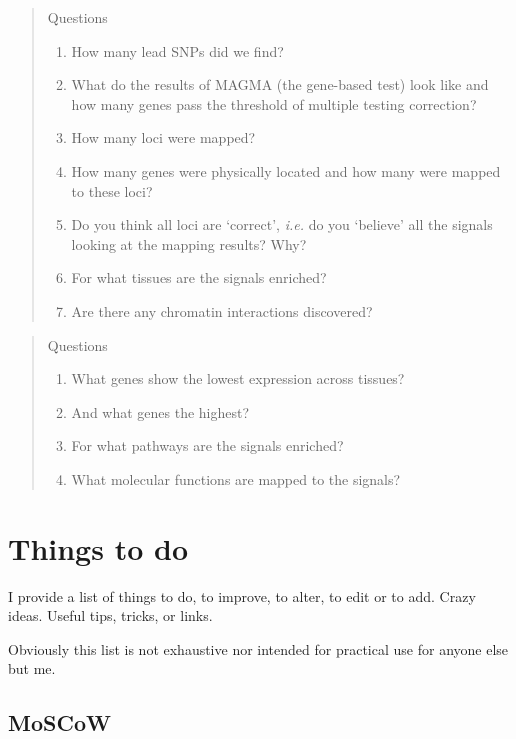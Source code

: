 \documentclass[
]{book}
\providecommand{\tightlist}{%
  \setlength{\itemsep}{0pt}\setlength{\parskip}{0pt}}
\begin{document}
\begin{quote}
Questions

\begin{enumerate}
\def\labelenumi{\arabic{enumi}.}
\tightlist
\item
  How many lead SNPs did we find?
\item
  What do the results of MAGMA (the gene-based test) look like and how many genes pass the threshold of multiple testing correction?
\item
  How many loci were mapped?
\item
  How many genes were physically located and how many were mapped to these loci?
\item
  Do you think all loci are `correct', \emph{i.e.} do you `believe' all the signals looking at the mapping results? Why?
\item
  For what tissues are the signals enriched?
\item
  Are there any chromatin interactions discovered?
\end{enumerate}
\end{quote}

\begin{quote}
Questions

\begin{enumerate}
\def\labelenumi{\arabic{enumi}.}
\tightlist
\item
  What genes show the lowest expression across tissues?
\item
  And what genes the highest?
\item
  For what pathways are the signals enriched?
\item
  What molecular functions are mapped to the signals?
\end{enumerate}
\end{quote}

\hypertarget{todo}{%
\chapter{Things to do}\label{todo}}

I provide a list of things to do, to improve, to alter, to edit or to add. Crazy ideas. Useful tips, tricks, or links.

Obviously this list is not exhaustive nor intended for practical use for anyone else but me.

\hypertarget{moscow}{%
\section{MoSCoW}\label{moscow}}
\end{document}
